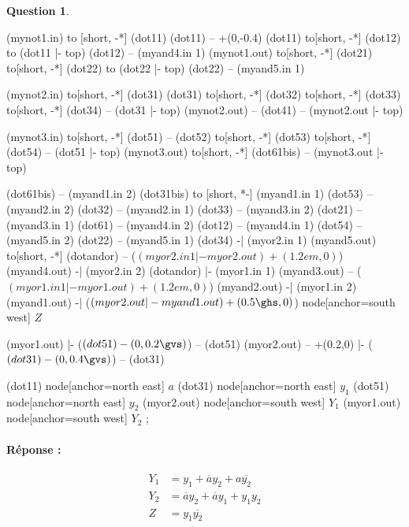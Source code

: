 \documentclass[11pt,a4paper,dvipsnames,]{article}
\theoremstyle{definition}%
\newtheorem{Q}{Question}[] %
\newcommand{\reponse}[1]{%
	\ifthenelse {\boolean{corrige}} {\paragraph{Réponse :} \color{darkblue}   #1\color{black}} {}
 }
\newlength{\gvs}%
\newlength{\ghs}%
\begin{document}
\begin{Q}
\begin{enumerate}
\begin{center}
\begin{circuitikz}[scale=0.7, every node/.style={scale=0.7}]
				(mynot1.in) to [short, -*] (dot11)
				(dot11) -- +(0,-0.4\gvs)
				(dot11) to[short, -*] (dot12) to (dot11 |- top)
				(dot12) -- (myand4.in 1)
				(mynot1.out) to[short, -*] (dot21) to[short, -*] (dot22) to (dot22 |- top)
				(dot22) -- (myand5.in 1)
		
				(mynot2.in) to[short, -*] (dot31)
				(dot31) to[short, -*] (dot32) to[short, -*] (dot33) to[short, -*] (dot34) -- (dot31 |- top)
				(mynot2.out) -- (dot41) -- (mynot2.out |- top)
		
				(mynot3.in) to[short, -*] (dot51) -- (dot52) to[short, -*] (dot53) to[short, -*] (dot54) -- (dot51 |- top)
				(mynot3.out) to[short, -*] (dot61bis) -- (mynot3.out |- top)
		
				(dot61bis) -- (myand1.in 2)
				(dot31bis) to [short, *-] (myand1.in 1)
				(dot53) -- (myand2.in 2)
				(dot32) -- (myand2.in 1)
				(dot33) -- (myand3.in 2)
				(dot21) -- (myand3.in 1)
				(dot61) -- (myand4.in 2)
				(dot12) -- (myand4.in 1)
				(dot54) -- (myand5.in 2)
				(dot22) -- (myand5.in 1)
				(dot34) -| (myor2.in 1)
				(myand5.out) to[short, -*] (dotandor) -- ($(myor2.in 1 |- myor2.out)+(1.2em,0)$)%
				(myand4.out) -| (myor2.in 2)
				(dotandor) |- (myor1.in 1)
				(myand3.out) -- ($(myor1.in 1 |- myor1.out)+(1.2em,0)$)
				(myand2.out) -| (myor1.in 2)
				(myand1.out) -| ($(myor2.out |- myand1.out)+(0.5\ghs,0)$) node[anchor=south west] {\Large $Z$}
		
				(myor1.out) |- ($(dot51)-(0,0.2\gvs)$) -- (dot51)
				(myor2.out) -- +(0.2\ghs,0) |- ($(dot31)-(0,0.4\gvs)$) -- (dot31)
		
				(dot11) node[anchor=north east] {\Large $a$}
				(dot31) node[anchor=north east] {\Large $y_1$}
				(dot51) node[anchor=north east] {\Large $y_2$}
				(myor2.out) node[anchor=south west] {\Large $Y_1$}
				(myor1.out) node[anchor=south west] {\Large $Y_2$}
				;
			\end{circuitikz}
		\end{center}
		\reponse{
			\begin{align*}
				Y_1 & = y_1 + \overline{a}y_2 + a\overline{y_2}\\
				Y_2 & = \overline{a}y_2 + \overline{a}y_1 + y_1y_2\\
				Z & = y_1\overline{y_2}
			\end{align*}

}
\end{enumerate}
\end{Q}
\end{document}
